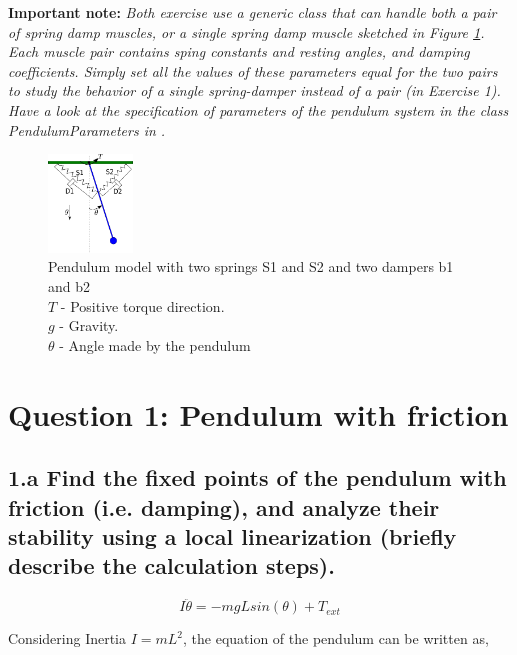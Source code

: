 \documentclass{cmc}
\begin{document}
\textbf{Important note:}
\textit{Both exercise use a generic class that can handle both a pair of
		spring damp muscles, or a single spring damp muscle sketched in Figure		
		\ref{fig:spring_mass_damper_sketch}. Each muscle pair
		contains sping constants and resting angles, and damping coefficients.
		Simply set all the values of these parameters equal for the two pairs
		to study the behavior of a single spring-damper instead of a pair (in Exercise 1).
		Have a look at the specification of parameters of the pendulum
		system in the class \textit{PendulumParameters} in .}


\begin{figure}[ht]
  \centering \includegraphics[width=0.2\textwidth]{figures/pendulum_spring_damper}
  \caption[pendulum with spring]{Pendulum model with two springs S1
    and S2 and two dampers b1 and b2\\
    $T$ - Positive torque direction.\\
    $g$ - Gravity.\\
    $\theta$ - Angle made by the pendulum
    \label{fig:spring_mass_damper_sketch} }
\end{figure}



\section*{Question 1: Pendulum with friction}

\subsection*{1.a Find the fixed points of the pendulum with friction
  (i.e. damping), and analyze their stability using a local linearization
  (briefly describe the calculation steps). }


\begin{equation}
  \label{eq:ode-pendulum}
  I\ddot{\theta} = -mgLsin(\theta) + T_{ext}
\end{equation}

Considering Inertia $I = mL^2$, the equation of the pendulum can be
written as,
\end{document}
